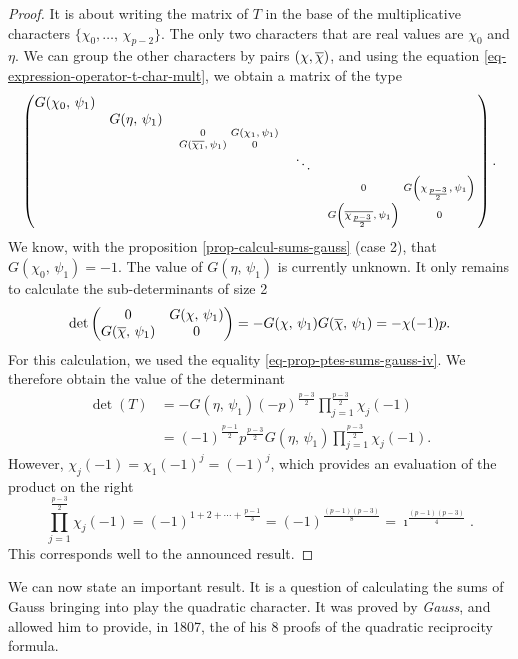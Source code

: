 \begin{proof}
It is about writing the matrix of $ T $ in the base of the multiplicative characters $ \{\chi_0, \ldots, \, \chi_{p-2}\} $. The only two characters that are real values are $ \chi_0 $ and $ \eta $. We can group the other characters by pairs $ (\chi, \overline{\chi}) $, and using the equation \eqref{eq-expression-operator-t-char-mult}, we obtain a matrix of the type
\begin{equation*}
\begin{pmatrix} G (\chi_0, \, \psi_1) & & & & \\& G (\eta, \, \psi_1) & & & \\& & \begin{smallmatrix} 0 & G (\chi_1 , \, \psi_1) \\G (\overline{\chi_1}, \, \psi_1) & 0 \end{smallmatrix} & & \\& & & \ddots & \\& & & & \begin{smallmatrix} 0 & G \left(\chi_{\frac{p-3}{2}}, \, \psi_1 \right) \\G \left(\overline{\chi_{\frac{p-3}{2} }}, \, \psi_1 \right) & 0 \end{smallmatrix} \end{pmatrix}.
\end{equation*}
We know, with the proposition \ref{prop-calcul-sums-gauss} (case 2), that $ G (\chi_0, \, \psi_1) = -1 $. The value of $ G (\eta, \, \psi_1) $ is currently unknown. It only remains to calculate the sub-determinants of size 2
\begin{equation*}
\det \begin{pmatrix} 0 & G (\chi, \, \psi_1) \\G (\overline{\chi}, \, \psi_1) & 0 \end{pmatrix} = -G (\chi, \, \psi_1) G (\overline{\chi}, \, \psi_1) = - \chi (-1) p.
\end{equation*}
 For this calculation, we used the equality \eqref{eq-prop-ptes-sums-gauss-iv}. We therefore obtain the value of the determinant
\begin{align*}
\det (T) & = -G (\eta, \, \psi_1) (-p)^{\frac{p-3}{2}} \prod_{j = 1}^{\frac{p-3 }{2}}{\chi_j (-1)} \\
& = (-1)^{\frac{p-1}{2}} p^{\frac{p-3}{2}} G (\eta, \, \psi_1) \prod_{j = 1}^{\frac{p-3}{2}}{\chi_j (-1)}.
\end{align*}
However, $ \chi_j (-1) = \chi_1 (-1)^j = (-1)^j $, which provides an evaluation of the product on the right
\begin{equation*}
\prod_{j = 1}^{\frac{p-3}{2}}{\chi_j (-1)} = (-1)^{1 + 2 + \cdots + \frac{p-1}{3 }} = (-1)^{\frac{(p-1) (p-3)}{8}} = \imath^{\frac{(p-1) (p-3)}{4}} .
\end{equation*}
This corresponds well to the announced result.
\end{proof}
We can now state an important result. It is a question of calculating the sums of Gauss bringing into play the quadratic character. It was proved by \textit{Gauss}, and allowed him to provide, in 1807, the  of his 8 proofs of the quadratic reciprocity formula.
 

